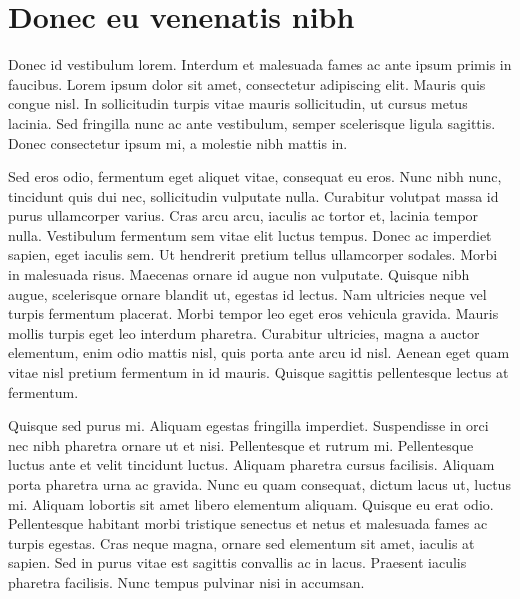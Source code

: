 ﻿\chapter{Donec eu venenatis nibh}

Donec id vestibulum lorem. Interdum et malesuada fames ac ante ipsum primis in faucibus. Lorem ipsum dolor sit amet, consectetur adipiscing elit. Mauris quis congue nisl. In sollicitudin turpis vitae mauris sollicitudin, ut cursus metus lacinia. Sed fringilla nunc ac ante vestibulum, semper scelerisque ligula sagittis. Donec consectetur ipsum mi, a molestie nibh mattis in.

Sed eros odio, fermentum eget aliquet vitae, consequat eu eros. Nunc nibh nunc, tincidunt quis dui nec, sollicitudin vulputate nulla. Curabitur volutpat massa id purus ullamcorper varius. Cras arcu arcu, iaculis ac tortor et, lacinia tempor nulla. Vestibulum fermentum sem vitae elit luctus tempus. Donec ac imperdiet sapien, eget iaculis sem. Ut hendrerit pretium tellus ullamcorper sodales. Morbi in malesuada risus. Maecenas ornare id augue non vulputate. Quisque nibh augue, scelerisque ornare blandit ut, egestas id lectus. Nam ultricies neque vel turpis fermentum placerat. Morbi tempor leo eget eros vehicula gravida. Mauris mollis turpis eget leo interdum pharetra. Curabitur ultricies, magna a auctor elementum, enim odio mattis nisl, quis porta ante arcu id nisl. Aenean eget quam vitae nisl pretium fermentum in id mauris. Quisque sagittis pellentesque lectus at fermentum.

Quisque sed purus mi. Aliquam egestas fringilla imperdiet. Suspendisse in orci nec nibh pharetra ornare ut et nisi. Pellentesque et rutrum mi. Pellentesque luctus ante et velit tincidunt luctus. Aliquam pharetra cursus facilisis. Aliquam porta pharetra urna ac gravida. Nunc eu quam consequat, dictum lacus ut, luctus mi. Aliquam lobortis sit amet libero elementum aliquam. Quisque eu erat odio. Pellentesque habitant morbi tristique senectus et netus et malesuada fames ac turpis egestas. Cras neque magna, ornare sed elementum sit amet, iaculis at sapien. Sed in purus vitae est sagittis convallis ac in lacus. Praesent iaculis pharetra facilisis. Nunc tempus pulvinar nisi in accumsan. 